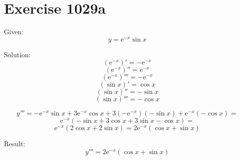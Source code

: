 \documentclass[a4paper, 10pt]{scrartcl}
\newcommand*\euler{\mathrm{e}}
\begin{document}
\section{Exercise 1029a}

Given:
\[
y = \euler^{-x}\sin{x}
\]

Solution:
\[
(\euler^{-x})' = -\euler^{-x}
\]
\[
(\euler^{-x})'' = \euler^{-x}
\]
\[
(\euler^{-x})''' = -\euler^{-x}
\]
\[
(\sin{x})' = \cos{x}
\]
\[
(\sin{x})'' = -\sin{x}
\]
\[
(\sin{x})''' = -\cos{x}
\]

\[
y''' = -\euler^{-x}\sin{x} + 3\euler^{-x}\cos{x} + 3(-\euler^{-x})(-\sin{x}) + \euler^{-x}(-\cos{x}) =
\]
\[
\euler^{-x}(-\sin{x} + 3\cos{x} + 3\sin{x} - \cos{x}) =
\]
\[
\euler^{-x}(2\cos{x} + 2\sin{x}) = 2\euler^{-x}(\cos{x} + \sin{x})
\]

Result:
\[
y''' = 2\euler^{-x}(\cos{x} + \sin{x})
\]
\end{document}
